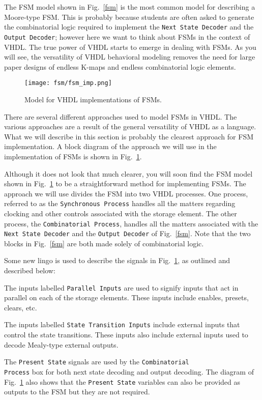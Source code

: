 The FSM model shown in Fig.~\ref{fsm} is the most common model for describing a Moore-type FSM. This is probably because students are often asked to generate the combinatorial logic required to implement the \texttt{Next State Decoder} and the \texttt{Output Decoder}; however here we want to think about FSMs in the context of VHDL. The true power of VHDL starts to emerge in dealing with FSMs. As you will see, the versatility of VHDL behavioral modeling removes the need for large paper designs of endless K-maps and endless combinatorial logic elements.

\begin{figure}[t]
    \centering
	\texttt{[image: fsm/fsm\_imp.png]}
	\caption{Model for VHDL implementations of FSMs.}
	\label{fsm_imp}
\end{figure}

There are several different approaches used to model FSMs in VHDL. The various approaches are a result of the general versatility of VHDL as a language. What we will describe in this section is probably the clearest approach for FSM implementation. A block diagram of the approach we will use in the implementation of FSMs is shown in Fig.~\ref{fsm_imp}.

Although it does not look that much clearer, you will soon find the FSM model shown in Fig.~\ref{fsm_imp} to be a straightforward method for implementing FSMs. The approach we will use divides the FSM into two VHDL processes. One process, referred to as the \texttt{Synchronous Process} handles all the matters regarding clocking and other controls associated with the storage element. The other process, the \texttt{Combinatorial Process}, handles all the matters associated with the \texttt{Next State Decoder} and the \texttt{Output Decoder} of Fig.~\ref{fsm}. Note that the two blocks in Fig.~\ref{fsm} are both made solely of combinatorial logic.


Some new lingo is used to describe the signals in Fig.~\ref{fsm_imp}, as outlined and described below: 
\begin{my_list}
\item The inputs labelled \texttt{Parallel Inputs} are used to signify inputs that act in parallel on each of the storage elements. These inputs include enables, presets, clears, etc. 

\item The inputs labelled \texttt{State Transition Inputs} include external inputs that control the state transitions. These inputs also include external inputs used to decode Mealy-type external outputs. 

\item The \texttt{Present State} signals are used by the \texttt{Combinatorial \\ Process} box for both next state decoding and output decoding. The diagram of Fig.~\ref{fsm_imp} also shows that the \texttt{Present State} variables can also be provided as outputs to the FSM but they are not required.
\end{my_list}

